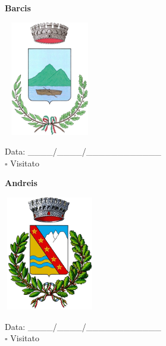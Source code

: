 \documentclass[a5paper,12pt]{article}
\begin{document}
\noindent
\begin{minipage}[t]{0.45\textwidth}
    \begin{center}
        \textbf{Barcis}
    \end{center}
    \vspace{-0.5cm} %
    \begin{center}
        \includegraphics[height= 5cm, width=4cm]{Friuli Venezia Giulia/Barcis-Stemma.png}
    \end{center}
    \vspace{-0.4cm} %
    \begin{flushleft}
        Data: \_\_\_\_/\_\_\_\_/\_\_\_\_\_\_\_\_\_\_\_\_ \\
        $\square$ Visitato
    \end{flushleft}
\end{minipage}
\hfill
\noindent
\begin{minipage}[t]{0.45\textwidth}
    \begin{center}
        \textbf{Andreis}
    \end{center}
    \vspace{-0.5cm} %
    \begin{center}
        \includegraphics[height= 5cm, width=4cm]{Friuli Venezia Giulia/Andreis-Stemma.png}
    \end{center}
    \vspace{-0.4cm} %
    \begin{flushleft}
        Data: \_\_\_\_/\_\_\_\_/\_\_\_\_\_\_\_\_\_\_\_\_ \\
        $\square$ Visitato
    \end{flushleft}
\end{minipage}
\end{document}
